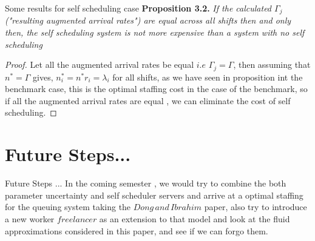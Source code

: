 \documentclass[9pt]{beamer}
\begin{document}
\begin{frame}{Some results for self scheduling case}
    \textbf{Proposition 3.2.} \textit{If the calculated $\Gamma_j$ ("resulting augmented arrival rates") are equal across all shifts then and only then, the self scheduling system is not more expensive than a system with no self scheduling}
    \begin{proof} \label{}
Let all the augmented arrival rates be equal $i.e$ $\Gamma_j=\Gamma$, then assuming that $n^{*}=\Gamma$ gives, $n_i^{*}=n^{*}r_i=\lambda_i$ for all shifts, as we have seen in proposition int the benchmark case, this is the optimal staffing cost in the case of the benchmark, so if all the augmented arrival rates are equal , we can eliminate the cost of self scheduling. 
\end{proof}
\end{frame}
\section{Future Steps...}
\begin{frame}{Future Steps ...}
    In the coming semester , we would try to combine the both parameter uncertainty and self scheduler servers and arrive at a optimal staffing for the queuing system taking the $Dong\,and\,Ibrahim$ paper, also try to introduce a new worker $freelancer$ as an extension to that model and look at the fluid approximations considered in this paper, and see if we can forgo them.
\end{frame}
\end{document}
